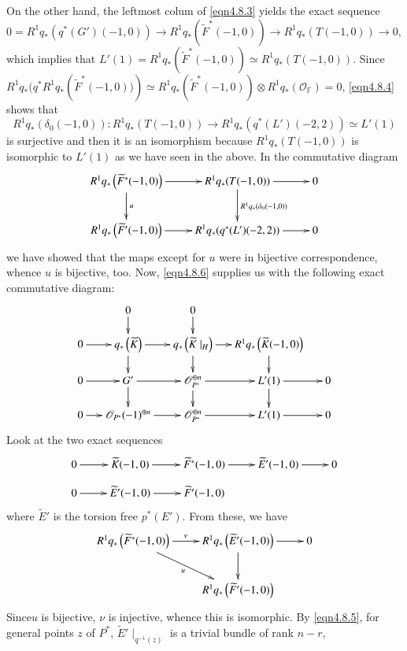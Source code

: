 \begin{Proof}
On the other hand, the leftmost colum of \eqref{eqn4.8.3} yields the
exact sequence 
$$
0=R^{1}q_{\ast}(q^{\ast}(G')(-1,0))\to
R^{1}q_{\ast}\left(\widetilde{F}^{\ast}(-1,0)\right)\to
R^{1}q_{\ast}(T(-1,0))\to 0, 
$$
which implies that
$L'(1)=R^{1}q_{\ast}\left(\widetilde{F}^{\ast}(-1,0)\right)\simeq
R^{1}q_{\ast}(T(-1,0))$. Since
$R^{1}q_{\ast}(q^{\ast}R^{1}q_{\ast}\left(\widetilde{F}^{\ast}(-1,0))\right)\simeq
R^{1}q_{\ast}\left(\widetilde{F}^{\ast}(-1,0)\right)\otimes
R^{1}q_{\ast}\left(\mathscr{O}_{\mathbb{F}}\right)=0$, \eqref{eqn4.8.4}
shows that 
$$
R^{1}q_{\ast}(\delta_0(-1,0)):R^{1}q_{\ast}(T(-1,0))\to
R^{1}q_{\ast}(q^{\ast}(L')(-2,2))\simeq L'(1)
$$
is surjective and then it is an isomorphism because
$R^{1}q_{\ast}(T(-1,0))$ is isomorphic to $L'(1)$ as we have seen in
the above. In the commutative diagram 
$$
\xymatrix{R^{1}q_{\ast}\left(\widetilde{F}^{\ast}(-1,0)\right)\ar[d]^{u}\ar[r]& R^{1}q_{\ast}(T(-1,0))\ar[d]^{R^{1}q_{\ast}(\delta_0(-1,0))}\ar[r]&0\\
R^{1}q_{\ast}\left(\widetilde{F}'(-1,0)\right)\ar[r]& R^{1}q_{\ast}(q^{\ast}(L')(-2,2))\ar[r]&0}
$$\pageoriginale
we have showed that the maps except for $u$ were in bijective
correspondence, whence $u$ is bijective, too. Now, \eqref{eqn4.8.6}
supplies us with the following exact commutative diagram:
$$
\xymatrix@=.5cm{&0\ar[d]&0\ar[d]&&\\
0\ar[r]&
  q_{\ast}\left(\widetilde{K}\right)\ar[d]\ar[r]&q_{\ast}\left(\widetilde{K}\mid_H\right)\ar[d]\ar[r]& R^{1}q_{\ast}\left(\widetilde{K}(-1,0)\right)\ar[d]\\
0\ar[r]& G'\ar[d]\ar[r]&\mathscr{O}^{\oplus
  n}_{P^{\ast}}\ar[d]\ar[r]&L'(1)\ar[d]\ar[r]&0\\
0\ar[r]& \mathscr{O}_{P^{\ast}}(-1)^{\oplus
  n}\ar[r]&\mathscr{O}^{\oplus n}_{P^{\ast}}\ar[r]& L'(1)\ar[r]&0}
$$
Look at the two exact sequences 
$$
\xymatrix@R=.3cm{0\ar[r]&\widetilde{K}(-1,0)\ar[r]&\widetilde{F}^{\ast}(-1,0)\ar[r]&\widetilde{E}'(-1,0)\ar[r]&0\\
0\ar[r]& \widetilde{E}'(-1,0)\ar[r]&\widetilde{F}'(-1,0)}
$$
where $\widetilde{E}'$ is the torsion free $p^{\ast}(E')$. From these,
we have 
$$
\xymatrix{R^{1}q_{\ast}\left(\widetilde{F}^{\ast}(-1,0)\right)\ar[dr]_{u}\ar[r]^{\nu}&R^{1}q_{\ast}\left(\widetilde{E}'(-1,0)\right)\ar[d]\ar[r]&0\\
&R^{1}q_{\ast}\left(\widetilde{F}'(-1,0)\right)&}
$$
Since\pageoriginale $u$ is bijective, $\nu$ is injective, whence this is
isomorphic. By \ref{eqn4.8.5}, for general points $z$ of $P^{\ast}$,
$\widetilde{E}'\mid_{q^{-1}(z)}$ is a trivial bundle of rank $n-r$,

\end{Proof}
